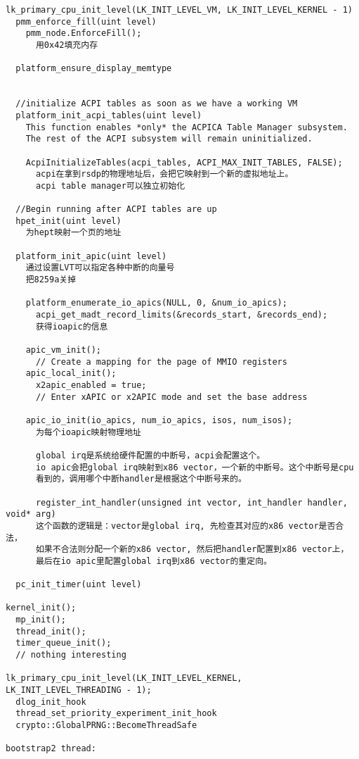 \begin{verbatim}
lk_primary_cpu_init_level(LK_INIT_LEVEL_VM, LK_INIT_LEVEL_KERNEL - 1)
  pmm_enforce_fill(uint level)
    pmm_node.EnforceFill();
      用0x42填充内存

  platform_ensure_display_memtype


  //initialize ACPI tables as soon as we have a working VM
  platform_init_acpi_tables(uint level)
    This function enables *only* the ACPICA Table Manager subsystem.
    The rest of the ACPI subsystem will remain uninitialized.

    AcpiInitializeTables(acpi_tables, ACPI_MAX_INIT_TABLES, FALSE);
      acpi在拿到rsdp的物理地址后，会把它映射到一个新的虚拟地址上。
      acpi table manager可以独立初始化
  
  //Begin running after ACPI tables are up
  hpet_init(uint level)
    为hept映射一个页的地址

  platform_init_apic(uint level)
    通过设置LVT可以指定各种中断的向量号
    把8259a关掉

    platform_enumerate_io_apics(NULL, 0, &num_io_apics);
      acpi_get_madt_record_limits(&records_start, &records_end);
      获得ioapic的信息

    apic_vm_init();
      // Create a mapping for the page of MMIO registers
    apic_local_init();
      x2apic_enabled = true;
      // Enter xAPIC or x2APIC mode and set the base address

    apic_io_init(io_apics, num_io_apics, isos, num_isos);
      为每个ioapic映射物理地址

      global irq是系统给硬件配置的中断号，acpi会配置这个。
      io apic会把global irq映射到x86 vector，一个新的中断号。这个中断号是cpu
      看到的，调用哪个中断handler是根据这个中断号来的。

      register_int_handler(unsigned int vector, int_handler handler, void* arg)
      这个函数的逻辑是：vector是global irq, 先检查其对应的x86 vector是否合法，
      如果不合法则分配一个新的x86 vector, 然后把handler配置到x86 vector上，
      最后在io apic里配置global irq到x86 vector的重定向。

  pc_init_timer(uint level)

kernel_init();
  mp_init();
  thread_init();
  timer_queue_init();
  // nothing interesting

lk_primary_cpu_init_level(LK_INIT_LEVEL_KERNEL, LK_INIT_LEVEL_THREADING - 1);
  dlog_init_hook
  thread_set_priority_experiment_init_hook
  crypto::GlobalPRNG::BecomeThreadSafe

bootstrap2 thread:


\end{verbatim}
